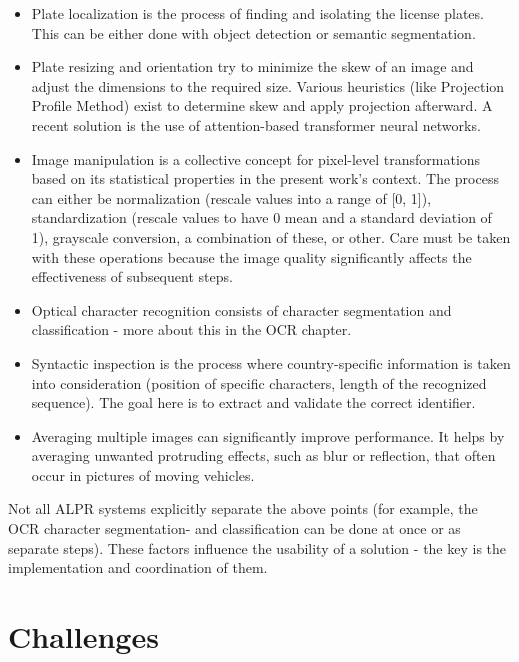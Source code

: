 \begin{itemize}

\item Plate localization is the process of finding and isolating the license plates. This can be either done with object detection or semantic segmentation.

\item Plate resizing and orientation try to minimize the skew of an image and adjust the dimensions to the required size. Various heuristics (like Projection Profile Method\cite{ProjectionProfileMethod}) exist to determine skew and apply projection afterward. A recent solution is the use of attention-based transformer neural networks\cite{SpatialTransformerNetworks}.

\item Image manipulation is a collective concept for pixel-level transformations based on its statistical properties in the present work’s context. The process can either be normalization (rescale values into a range of [0, 1]), standardization (rescale values to have 0 mean and a standard deviation of 1), grayscale conversion, a combination of these, or other. Care must be taken with these operations because the image quality significantly affects the effectiveness of subsequent steps.

\item Optical character recognition consists of character segmentation and classification - more about this in the OCR chapter.

\item Syntactic inspection is the process where country-specific information is taken into consideration (position of specific characters, length of the recognized sequence). The goal here is to extract and validate the correct identifier.

\item Averaging multiple images can significantly improve performance. It helps by averaging unwanted protruding effects, such as blur or reflection, that often occur in pictures of moving vehicles.

\end{itemize}

Not all ALPR systems explicitly separate the above points (for example, the OCR character segmentation- and classification can be done at once or as separate steps). These factors influence the usability of a solution - the key is the implementation and coordination of them.

\section{Challenges}

